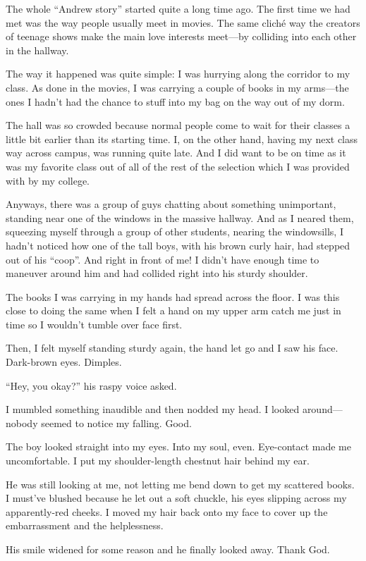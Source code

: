 The whole “Andrew story” started quite a long time ago. The first time we had met was the way people usually meet in movies. The same cliché way the creators of teenage shows make the main love interests meet—by colliding into each other in the hallway.

The way it happened was quite simple: I was hurrying along the corridor to my class. As done in the movies, I was carrying a couple of books in my arms—the ones I hadn’t had the chance to stuff into my bag on the way out of my dorm.

The hall was so crowded because normal people come to wait for their classes a little bit earlier than its starting time. I, on the other hand, having my next class way across campus, was running quite late. And I did want to be on time as it was my favorite class out of all of the rest of the selection which I was provided with by my college.

Anyways, there was a group of guys chatting about something unimportant, standing near one of the windows in the massive hallway. And as I neared them, squeezing myself through a group of other students, nearing the windowsills, I hadn’t noticed how one of the tall boys, with his brown curly hair, had stepped out of his “coop”. And right in front of me! I didn’t have enough time to maneuver around him and had collided right into his sturdy shoulder.

The books I was carrying in my hands had spread across the floor. I was this close to doing the same when I felt a hand on my upper arm catch me just in time so I wouldn’t tumble over face first.

Then, I felt myself standing sturdy again, the hand let go and I saw his face. Dark-brown eyes. Dimples.

“Hey, you okay?” his raspy voice asked.

I mumbled something inaudible and then nodded my head. I looked around—nobody seemed to notice my falling. Good.

The boy looked straight into my eyes. Into my soul, even. Eye-contact made me uncomfortable. I put my shoulder-length chestnut hair behind my ear.

He was still looking at me, not letting me bend down to get my scattered books. I must’ve blushed because he let out a soft chuckle, his eyes slipping across my apparently-red cheeks. I moved my hair back onto my face to cover up the embarrassment and the helplessness.

His smile widened for some reason and he finally looked away. Thank God.

